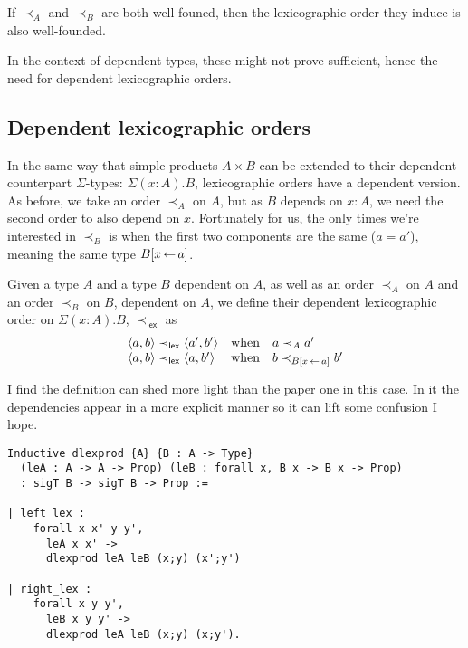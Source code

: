 \begin{lemma}
  If \(\prec_A\) and \(\prec_B\) are both well-founed, then the lexicographic
  order they induce is also well-founded.
\end{lemma}


In the context of dependent types, these might not prove sufficient, hence the
need for dependent lexicographic orders.

\subsection{Dependent lexicographic orders}

In the same way that simple products \(A \times B\) can be extended to their
dependent counterpart \(\Sigma\)-types: \(\Sigma (x:A). B\), lexicographic
orders have a dependent version.
As before, we take an order \(\prec_A\) on \(A\), but as \(B\) depends on
\(x : A\), we need the second order to also depend on \(x\). Fortunately for us,
the only times we're interested in \(\prec_B\) is when the first two components
are the same (\(a = a'\)), meaning the same type \(B[x \mathop{\leftarrow} a]\).

\begin{definition}
  Given a type \(A\) and a type \(B\) dependent on \(A\), as well as an order
  \(\prec_A\) on \(A\) and an order \(\prec_B\) on \(B\), dependent on \(A\),
  we define their dependent lexicographic order on \(\Sigma (x:A). B\),
  \(\prec_{\mathsf{lex}}\) as
  \[
    \begin{array}{lcl}
      \langle a,b \rangle \prec_{\mathsf{lex}} \langle a',b' \rangle &\text{when}&
      a \prec_A a' \\
      \langle a,b \rangle \prec_{\mathsf{lex}} \langle a,b' \rangle &\text{when}&
      b \prec_{B[x \mathop{\leftarrow} a]} b'
    \end{array}
  \]
\end{definition}

I find the \Coq definition can shed more light than the paper one in this case.
In it the dependencies appear in a more explicit manner so it can lift some
confusion I hope.

\begin{verbatim}
Inductive dlexprod {A} {B : A -> Type}
  (leA : A -> A -> Prop) (leB : forall x, B x -> B x -> Prop)
  : sigT B -> sigT B -> Prop :=

| left_lex :
    forall x x' y y',
      leA x x' ->
      dlexprod leA leB (x;y) (x';y')

| right_lex :
    forall x y y',
      leB x y y' ->
      dlexprod leA leB (x;y) (x;y').
\end{verbatim}

